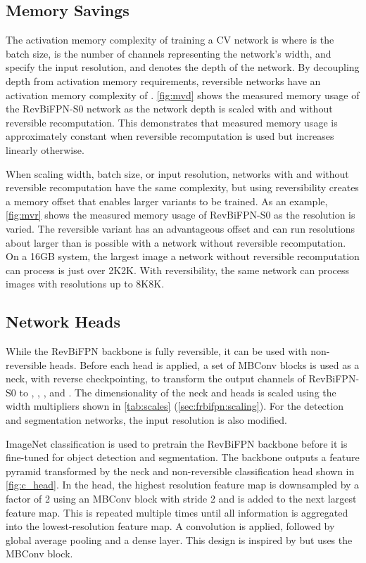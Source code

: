 \documentclass{article}
\begin{document}
\subsection{Memory Savings}
\label{sec:frbifpn:mem}

The activation memory complexity of training a CV network is  where  is the batch size,  is the number of channels representing the network's width,  and  specify the input resolution, and  denotes the depth of the network.
By decoupling depth from activation memory requirements, reversible networks have an activation memory complexity of .
\cref{fig:mvd} shows the measured memory usage of the RevBiFPN-S0 network as the network depth is scaled with and without reversible recomputation.
This demonstrates that measured memory usage is approximately constant when reversible recomputation is used but increases linearly otherwise.

When scaling width, batch size, or input resolution, networks with and without reversible recomputation have the same complexity, but using reversibility creates a memory offset that enables larger variants to be trained.
As an example, \cref{fig:mvr} shows the measured memory usage of RevBiFPN-S0 as the resolution is varied.
The reversible variant has an advantageous offset and can run resolutions about  larger than is possible with a network without reversible recomputation.
On a 16GB system, the largest image a network without reversible recomputation can process is just over 2K2K.
With reversibility, the same network can process images with resolutions up to 8K8K.

\subsection{Network Heads}
\label{sec:frbifpn:heads}

While the RevBiFPN backbone is fully reversible, it can be used with non-reversible heads. Before each head is applied, a set of MBConv blocks is used as a neck, with reverse checkpointing, to transform the output channels of RevBiFPN-S0 to , , , and . The dimensionality of the neck and heads is scaled using the width multipliers shown in \cref{tab:scales} (\cref{sec:frbifpn:scaling}).
For the detection and segmentation networks, the input resolution is also modified.

ImageNet classification is used to pretrain the RevBiFPN backbone before it is fine-tuned for object detection and segmentation.
The backbone outputs a feature pyramid transformed by the neck and non-reversible classification head shown in \cref{fig:c_head}.
In the head, the highest resolution feature map is downsampled by a factor of 2 using an MBConv block with stride 2 and is added to the next largest feature map.
This is repeated multiple times until all information is aggregated into the lowest-resolution feature map.
A  convolution is applied, followed by global average pooling and a dense layer. This design is inspired by \citet{sun2019hrnet_pose} but uses the MBConv block.
\end{document}
